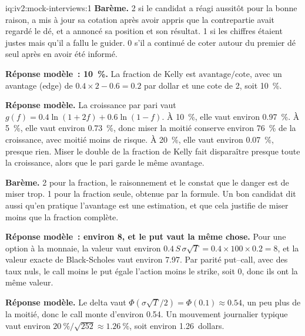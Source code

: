 \begin{solution}{iq:iv2:mock-interviews:1}
\textbf{Barème.} 2 si le candidat a réagi aussitôt pour la bonne raison, a mis à jour sa cotation après avoir appris que la contrepartie avait regardé le dé, et a annoncé sa position et son résultat. 1 si les chiffres étaient justes mais qu'il a fallu le guider. 0 s'il a continué de coter autour du premier dé seul après en avoir été informé.

\ivstop
\textbf{Réponse modèle~: 10~\%.} La fraction de Kelly est $\text{avantage}/\text{cote}$, avec un avantage (edge) de $0.4 \times 2 - 0.6 = 0.2$ par dollar et une cote de 2, soit 10~\%.

\ivstop
\textbf{Réponse modèle.} La croissance par pari vaut $g(f) = 0.4 \ln(1 + 2f) + 0.6 \ln(1 - f)$. À 10~\%, elle vaut environ 0.97~\%. À 5~\%, elle vaut environ 0.73~\%, donc miser la moitié conserve environ 76~\% de la croissance, avec moitié moins de risque. À 20~\%, elle vaut environ 0.07~\%, presque rien. Miser le double de la fraction de Kelly fait disparaître presque toute la croissance, alors que le pari garde le même avantage.

\textbf{Barème.} 2 pour la fraction, le raisonnement et le constat que le danger est de miser trop. 1 pour la fraction seule, obtenue par la formule. Un bon candidat dit aussi qu'en pratique l'avantage est une estimation, et que cela justifie de miser moins que la fraction complète.

\ivstop
\textbf{Réponse modèle~: environ 8, et le put vaut la même chose.} Pour une option à la monnaie, la valeur vaut environ $0.4\, S\, \sigma\sqrt{T} = 0.4 \times 100 \times 0.2 = 8$, et la valeur exacte de Black-Scholes vaut environ 7.97. Par parité put--call, avec des taux nuls, le call moins le put égale l'action moins le strike, soit 0, donc ils ont la même valeur.

\ivstop
\textbf{Réponse modèle.} Le delta vaut $\Phi(\sigma\sqrt{T}/2) = \Phi(0.1) \approx 0.54$, un peu plus de la moitié, donc le call monte d'environ 0.54. Un mouvement journalier typique vaut environ $20~\%/\sqrt{252} \approx 1.26~\%$, soit environ 1.26~dollars.


\end{solution}
